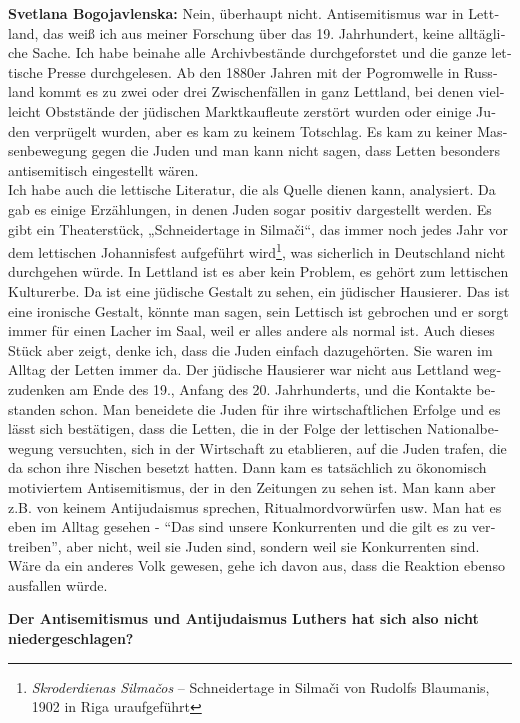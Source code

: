 \begin{otherlanguage}{ngerman}
\textbf{Svetlana Bogojavlenska:} Nein, überhaupt nicht. Antisemitismus war in Lettland, das weiß ich aus meiner Forschung über das 19. Jahrhundert, keine alltägliche Sache. Ich habe beinahe alle Archivbestände durchgeforstet und die ganze lettische Presse durchgelesen. Ab den 1880er Jahren mit der Pogromwelle in Russland kommt es zu zwei oder drei Zwischenfällen in ganz Lettland, bei denen vielleicht Obststände der jüdischen Marktkaufleute zerstört wurden oder einige Juden verprügelt wurden, aber es kam zu keinem Totschlag. Es kam zu keiner Massenbewegung gegen die Juden und man kann nicht sagen, dass Letten besonders antisemitisch eingestellt wären.\\
Ich habe auch die lettische Literatur, die als Quelle dienen kann, analysiert. Da gab es einige Erzählungen, in denen Juden sogar positiv dargestellt werden. Es gibt ein Theaterstück, „Schneidertage in Silmači“, das immer noch jedes Jahr vor dem lettischen Johannisfest aufgeführt wird\footnote{\textit{Skroderdienas Silmačos} – Schneidertage in Silmači von Rudolfs Blaumanis, 1902 in Riga uraufgeführt}, was sicherlich in Deutschland nicht durchgehen würde. In Lettland ist es aber kein Problem, es gehört zum lettischen Kulturerbe. Da ist eine jüdische Gestalt zu sehen, ein jüdischer Hausierer. Das ist eine ironische Gestalt, könnte man sagen, sein Lettisch ist gebrochen und er sorgt immer für einen Lacher im Saal, weil er alles andere als normal ist. Auch dieses Stück aber zeigt, denke ich, dass die Juden einfach dazugehörten. Sie waren im Alltag der Letten immer da. Der jüdische Hausierer war nicht aus Lettland wegzudenken am Ende des 19., Anfang des 20. Jahrhunderts, und die Kontakte bestanden schon. Man beneidete die Juden für ihre wirtschaftlichen Erfolge und es lässt sich bestätigen, dass die Letten, die in der Folge der lettischen Nationalbewegung versuchten, sich in der Wirtschaft zu etablieren, auf die Juden trafen, die da schon ihre Nischen besetzt hatten. Dann kam es tatsächlich zu ökonomisch motiviertem Antisemitismus, der in den Zeitungen zu sehen ist. Man kann aber z.B. von keinem Antijudaismus sprechen, Ritualmordvorwürfen usw. Man hat es eben im Alltag gesehen - "`Das sind unsere Konkurrenten und die gilt es zu vertreiben"', aber nicht, weil sie Juden sind, sondern weil sie Konkurrenten sind. Wäre da ein anderes Volk gewesen, gehe ich davon aus, dass die Reaktion ebenso ausfallen würde.

\textbf{Der Antisemitismus und Antijudaismus Luthers hat sich also nicht niedergeschlagen?}


\end{otherlanguage}

